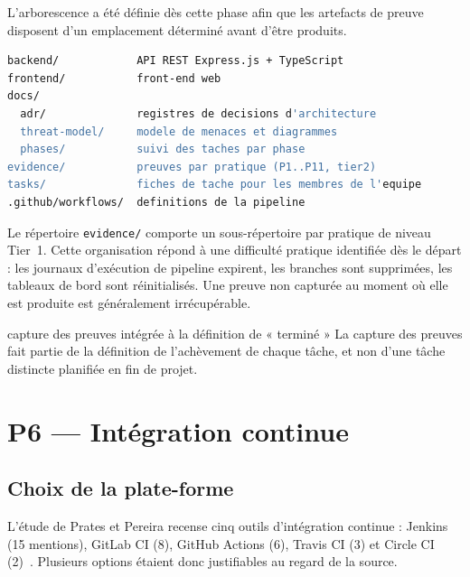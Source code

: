 L'arborescence a été définie dès cette phase afin que les artefacts de preuve
disposent d'un emplacement déterminé avant d'être produits.

\begin{lstlisting}[language=bash,caption={Arborescence du dépôt}]
backend/            API REST Express.js + TypeScript
frontend/           front-end web
docs/
  adr/              registres de decisions d'architecture
  threat-model/     modele de menaces et diagrammes
  phases/           suivi des taches par phase
evidence/           preuves par pratique (P1..P11, tier2)
tasks/              fiches de tache pour les membres de l'equipe
.github/workflows/  definitions de la pipeline
\end{lstlisting}

Le répertoire \texttt{evidence/} comporte un sous-répertoire par pratique de
niveau Tier~1. Cette organisation répond à une difficulté pratique identifiée
dès le départ : les journaux d'exécution de pipeline expirent, les branches sont
supprimées, les tableaux de bord sont réinitialisés. Une preuve non capturée au
moment où elle est produite est généralement irrécupérable.

\begin{decision}{capture des preuves intégrée à la définition de « terminé »}
La capture des preuves fait partie de la définition de l'achèvement de chaque
tâche, et non d'une tâche distincte planifiée en fin de projet.
\end{decision}

\section{P6 --- Intégration continue}
\label{sec:ci}

\subsection{Choix de la plate-forme}

L'étude de Prates et Pereira recense cinq outils d'intégration continue :
Jenkins (15 mentions), GitLab CI (8), GitHub Actions (6), Travis CI (3) et
Circle CI (2)~\cite{prates2025}. Plusieurs options étaient donc justifiables au
regard de la source.

